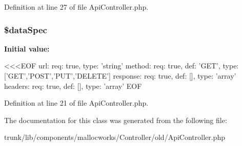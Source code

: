 Definition at line 27 of file ApiController.php.

\hypertarget{class_utopia_1_1_components_1_1_http_1_1_api_application_a2c03506d4d5ec05e8ff518e1e13dc585}{
\subsubsection[{\$dataSpec}]{\setlength{\rightskip}{0pt plus 5cm}\$dataSpec}}
\label{class_utopia_1_1_components_1_1_http_1_1_api_application_a2c03506d4d5ec05e8ff518e1e13dc585}
{\bfseries Initial value:}
\begin{DoxyCode}
 <<<EOF
url:      { req: true, type: 'string' }
method:   { req: true, def: 'GET', type: ['GET','POST','PUT','DELETE'] }
response: { req: true, def: [], type: 'array' }
headers:  { req: true, def: [], type: 'array' }
EOF
\end{DoxyCode}


Definition at line 21 of file ApiController.php.



The documentation for this class was generated from the following file:\begin{DoxyCompactItemize}
\item 
trunk/lib/components/mallocworks/Controller/old/ApiController.php\end{DoxyCompactItemize}
